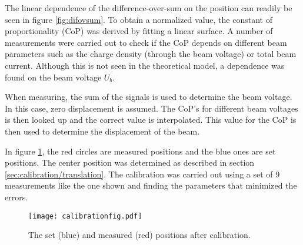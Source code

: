 The linear dependence of the difference-over-sum on the position can readily be seen in figure \ref{fig:difovsum}. To obtain a normalized value, the constant of proportionality (CoP) was derived by fitting a linear surface.
A number of measurements were carried out to check if the CoP depends on different beam parameters such as the charge density (through the beam voltage) or total beam current. Although this is not seen in the theoretical model, a dependence was found on the beam voltage $U_b$.

When measuring, the sum of the signals is used to determine the beam voltage. In this case, zero displacement is assumed. The CoP's for different beam voltages is then looked up and the correct value is interpolated. This value for the CoP is then used to determine the displacement of the beam.

In figure \ref{fig:calfig}, the red circles are measured positions and the blue ones are set positions. The center position was determined as described in section \ref{sec:calibration/translation}. The calibration was carried out using a set of 9 measurements like the one shown and finding the parameters that minimized the errors.

\begin{figure}[H]
\centering
\texttt{[image: calibrationfig.pdf]}
\caption{The set (blue) and measured (red) positions after calibration.}
\label{fig:calfig}
\end{figure}
